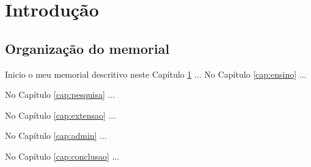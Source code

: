 
\chapter[Introdução]{Introdução}\label{cap:introducao}


\section{Organização do memorial}

Inicio o meu memorial descritivo neste Capítulo \ref{cap:introducao} ...
No Capítulo \ref{cap:ensino} ...

No Capítulo \ref{cap:pesquisa} ...

No Capítulo \ref{cap:extensao} ...

No Capítulo \ref{cap:admin} ...

No Capítulo \ref{cap:conclusao} ...




